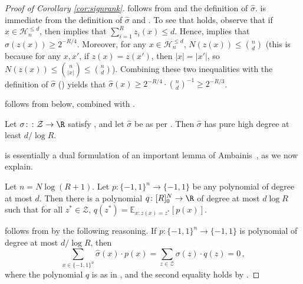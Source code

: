 \documentclass{toc}
\newcommand{\bits}{\{-1,1\}}
\begin{document}
\begin{proof}[Proof of Corollary \ref{cor:signrank}]
 follows from  and the definition of $\hat{\sigma}$.
 is immediate from the definition of $\hat{\sigma}$ and . 
To see that  holds, observe that if $x \in \mathcal{H}^{\leq d}_n$, then
 implies that $\sum_{i=1}^{R} z_i(x) \leq d$. Hence,
 implies that $\sigma(z(x)) \geq 2^{-R/4}$. Moreover, for any $x \in \mathcal{H}^{\leq d}_{n}$,
$N(z(x)) \leq {n \choose d}$ (this is because for any $x, x'$, if $z(x) = z(x')$, then $|x|=|x'|$, 
so $N(z(x)) \leq {n \choose |x|} \leq {n \choose d}$).
Combining these two inequalities with the definition of $\hat{\sigma}$ () yields
that $\hat{\sigma}(x) \geq 2^{-R/4} \cdot {n \choose d}^{-1} \geq 2^{-R/3}$. 


 follows from  below, combined with .

\begin{proposition}\label{keysrprop} Let $\sigma \colon\colon \mathcal{Z} \to \R$
	satisfy , and let $\hat{\sigma}$ be as per . 
	Then  
	$\hat{\sigma}$ has pure high degree at least $d/\log R$. 
\end{proposition}
 is essentially a dual formulation of an important lemma of Ambainis~\cite{ambainissmallrange}, as we now explain. 

%
\begin{lemma} \label{ambainislemma}
	Let $n=N \log(R+1)$. Let $p \colon \bits^n \to \bits$ be any polynomial of degree at most $d$. 
	Then there is a polynomial $q \colon [R]_0^N \to \R$ of degree at most $d \log R$
	such that for all $z^* \in \mathcal{Z}$, $q(z^*) = \mathbb{E}_{x \colon z(x)=z^*}[p(x)]$.
\end{lemma}
 follows from  by the following reasoning.
If $p \colon \bits^n \to \bits$ is polynomial of degree at most $d / \log R$,
then \begin{equation} \sum_{x \in \bits^n} \hat{\sigma}(x) \cdot p(x) = \sum_{z \in \mathcal{Z}} \sigma(z) \cdot q(z) =0\,, \label{sighsighsighsigh}\end{equation}
where the polynomial $q$ is as in , and the second equality holds by .


\end{proof}
\end{document}
